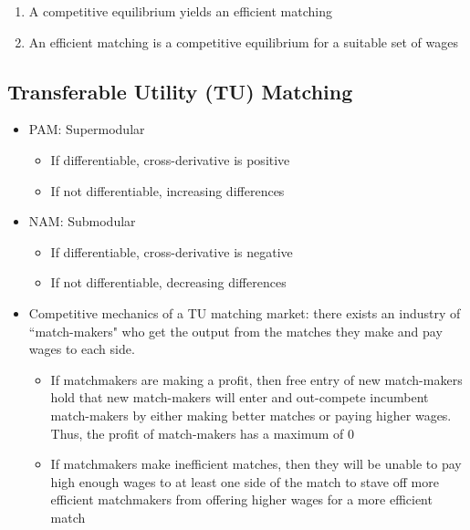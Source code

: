 \documentclass{article}
\begin{document}
\begin{enumerate}
	\item A competitive equilibrium yields an efficient matching
	
	\item An efficient matching is a competitive equilibrium for a suitable set of wages
\end{enumerate}





\subsection{Transferable Utility (TU) Matching}


\begin{itemize}
	\item PAM: Supermodular
		\begin{itemize}
			\item If differentiable, cross-derivative is positive
			\item If not differentiable, increasing differences 
		\end{itemize}
	\item NAM: Submodular
		\begin{itemize}
			\item If differentiable, cross-derivative is negative
			\item If not differentiable, decreasing differences 
		\end{itemize}
	
	\item Competitive mechanics of a TU matching market: there exists an industry of ``match-makers" who get the output from the matches they make and pay wages to each side.
		\begin{itemize}
			\item If matchmakers are making a profit, then free entry of new match-makers hold that new match-makers will enter and out-compete incumbent match-makers by either making better matches or paying higher wages. Thus, the profit of match-makers has a maximum of 0
			
			\item If matchmakers make inefficient matches, then they will be unable to pay high enough wages to at least one side of the match to stave off more efficient matchmakers from offering higher wages for a more efficient match
		\end{itemize}
	

\end{itemize}
\end{document}
